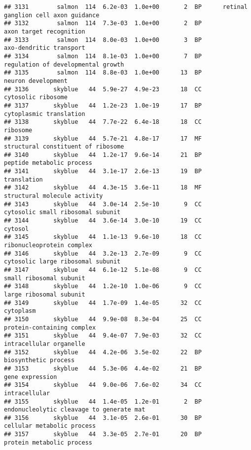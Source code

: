 \documentclass[]{article}
\begin{document}
\begin{verbatim}
## 3131        salmon  114  6.2e-03  1.0e+00       2  BP      retinal ganglion cell axon guidance
## 3132        salmon  114  7.3e-03  1.0e+00       2  BP                  axon target recognition
## 3133        salmon  114  8.0e-03  1.0e+00       3  BP                  axo-dendritic transport
## 3134        salmon  114  8.1e-03  1.0e+00       7  BP       regulation of developmental growth
## 3135        salmon  114  8.8e-03  1.0e+00      13  BP                       neuron development
## 3136       skyblue   44  5.9e-27  4.9e-23      18  CC                       cytosolic ribosome
## 3137       skyblue   44  1.2e-23  1.0e-19      17  BP                  cytoplasmic translation
## 3138       skyblue   44  7.7e-22  6.4e-18      18  CC                                 ribosome
## 3139       skyblue   44  5.7e-21  4.8e-17      17  MF       structural constituent of ribosome
## 3140       skyblue   44  1.2e-17  9.6e-14      21  BP                peptide metabolic process
## 3141       skyblue   44  3.1e-17  2.6e-13      19  BP                              translation
## 3142       skyblue   44  4.3e-15  3.6e-11      18  MF             structural molecule activity
## 3143       skyblue   44  3.0e-14  2.5e-10       9  CC        cytosolic small ribosomal subunit
## 3144       skyblue   44  3.6e-14  3.0e-10      19  CC                                  cytosol
## 3145       skyblue   44  1.1e-13  9.6e-10      18  CC                ribonucleoprotein complex
## 3146       skyblue   44  3.2e-13  2.7e-09       9  CC        cytosolic large ribosomal subunit
## 3147       skyblue   44  6.1e-12  5.1e-08       9  CC                  small ribosomal subunit
## 3148       skyblue   44  1.2e-10  1.0e-06       9  CC                  large ribosomal subunit
## 3149       skyblue   44  1.7e-09  1.4e-05      32  CC                                cytoplasm
## 3150       skyblue   44  9.9e-08  8.3e-04      25  CC               protein-containing complex
## 3151       skyblue   44  9.4e-07  7.9e-03      32  CC                  intracellular organelle
## 3152       skyblue   44  4.2e-06  3.5e-02      22  BP                     biosynthetic process
## 3153       skyblue   44  5.3e-06  4.4e-02      21  BP                          gene expression
## 3154       skyblue   44  9.0e-06  7.6e-02      34  CC                            intracellular
## 3155       skyblue   44  1.4e-05  1.2e-01       2  BP endonucleolytic cleavage to generate mat
## 3156       skyblue   44  3.1e-05  2.6e-01      30  BP               cellular metabolic process
## 3157       skyblue   44  3.3e-05  2.7e-01      20  BP                protein metabolic process

\end{verbatim}
\end{document}
